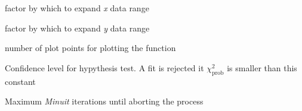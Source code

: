 \documentclass[a4paper,10pt,english]{sphinxmanual}
\begin{document}

\begin{fulllineitems}
\label{index:kafe.constants.G_PADDING_FACTOR_X}
factor by which to expand \emph{x} data range

\end{fulllineitems}


\begin{fulllineitems}
\label{index:kafe.constants.G_PADDING_FACTOR_Y}
factor by which to expand \emph{y} data range

\end{fulllineitems}


\begin{fulllineitems}
\label{index:kafe.constants.G_PLOT_POINTS}
number of plot points for plotting the function

\end{fulllineitems}


\begin{fulllineitems}
\label{index:kafe.constants.M_CONFIDENCE_LEVEL}
Confidence level for hypythesis test. A fit is rejected it $\chi^2_\text{prob}$ is smaller than this constant

\end{fulllineitems}


\begin{fulllineitems}
\label{index:kafe.constants.M_MAX_ITERATIONS}
Maximum \emph{Minuit} iterations until aborting the process

\end{fulllineitems}

\end{document}
